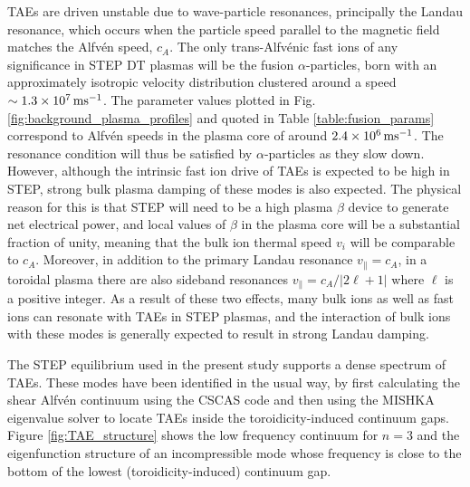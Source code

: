 \documentclass[10pt, a4paper, twoside]{article}
\begin{document}
TAEs are driven unstable due to wave-particle resonances, principally the Landau resonance, which occurs when the particle speed parallel to the magnetic field matches the Alfv\'en speed, $c_A$. The only trans-Alfv\'enic fast ions of any significance in STEP DT plasmas will be the fusion $\alpha$-particles, born with an approximately isotropic velocity distribution clustered around a speed $\sim 1.3\times10^7\text{\,ms}^{-1}$. The parameter values plotted in Fig. \ref{fig:background_plasma_profiles} and quoted in Table \ref{table:fusion_params} correspond to Alfv\'en speeds in the plasma core of around $2.4\times10^6\text{\,ms}^{-1}$. The resonance condition will thus be satisfied by $\alpha$-particles as they slow down. However, although the intrinsic fast ion drive of TAEs is expected to be high in STEP, strong bulk plasma damping of these modes is also expected. The physical reason for this is that STEP will need to be a high plasma $\beta$ device to generate net electrical power, and local values of $\beta$ in the plasma core will be a substantial fraction of unity, meaning that the bulk ion thermal speed $v_i$ will be comparable to $c_A$. Moreover, in addition to the primary Landau resonance $v_{\parallel}=c_A$, in a toroidal plasma there are also sideband resonances $v_{\parallel} = c_A/\vert 2\ell+1 \vert$ where $\ell$ is a positive integer. As a result of these two effects, many bulk ions as well as fast ions can resonate with TAEs in STEP plasmas, and the interaction of bulk ions with these modes is generally expected to result in strong Landau damping.

The STEP equilibrium used in the present study supports a dense spectrum of TAEs. These modes have been identified in the usual way, by first calculating the shear Alfv\'en continuum using the CSCAS code \cite{poedts1993} and then using the MISHKA eigenvalue solver \cite{mikhailovskii1997} to locate TAEs inside the toroidicity-induced continuum gaps. Figure \ref{fig:TAE_structure} shows the low frequency continuum for $n=3$ and the eigenfunction structure of an incompressible mode whose frequency is close to the bottom of the lowest (toroidicity-induced) continuum gap.   
 
\end{document}
